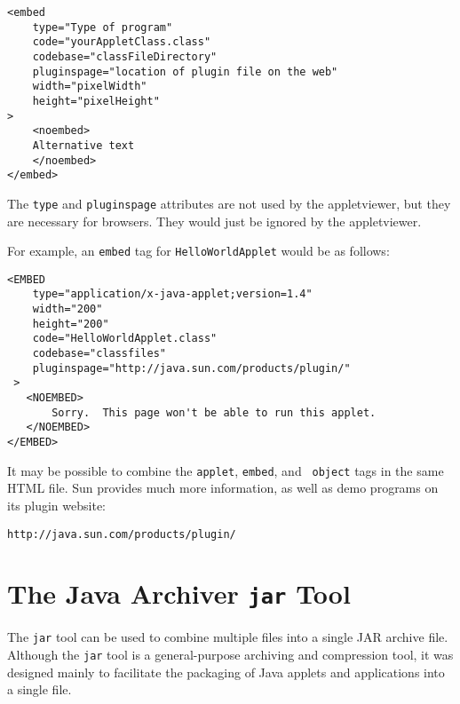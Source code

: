 \begin{jjjlisting}
\begin{lstlisting}
<embed
    type="Type of program"
    code="yourAppletClass.class"
    codebase="classFileDirectory"
    pluginspage="location of plugin file on the web"
    width="pixelWidth"
    height="pixelHeight"
>
    <noembed>
    Alternative text
    </noembed>
</embed>
\end{lstlisting}
\end{jjjlisting}

\noindent The {\tt type} and {\tt pluginspage} attributes
are not used by the appletviewer, but they are necessary for
browsers.  They would just be ignored by the appletviewer.

For example, an {\tt embed} tag for {\tt HelloWorldApplet}
would be as follows:

\begin{jjjlisting}
\begin{lstlisting}
<EMBED
    type="application/x-java-applet;version=1.4"
    width="200"
    height="200"
    code="HelloWorldApplet.class"
    codebase="classfiles"
    pluginspage="http://java.sun.com/products/plugin/"
 >
   <NOEMBED>
       Sorry.  This page won't be able to run this applet.
   </NOEMBED>
</EMBED>
\end{lstlisting}
\end{jjjlisting}

It may be possible to combine the {\tt applet}, {\tt embed}, and {\tt
object} tags in the same HTML file.  Sun provides much more information,
as well as demo programs on its plugin website:

\begin{jjjlisting}
\begin{lstlisting}[commentstyle=\color{black}]
http://java.sun.com/products/plugin/
\end{lstlisting}
\end{jjjlisting}

\vspace{-6pt}\section*{The Java Archiver {\tt jar} Tool}
\noindent The {\tt jar} tool can be used to combine multiple files into a single
JAR archive file.  Although the {\tt jar} tool is a general-purpose
archiving and compression tool, it was designed mainly to facilitate
the packaging of Java applets and applications into a single file.


